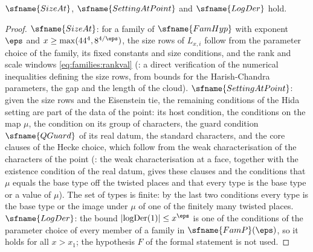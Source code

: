 \begin{lemma}\label{pf:fit:setting}
$\sfname{SizeAt}$, $\sfname{SettingAtPoint}$ and $\sfname{LogDer}$ hold.
\end{lemma}

\begin{proof}
$\sfname{SizeAt}$: for a family of $\sfname{FamHyp}$ with exponent $\eps$ and $x\ge\max(44^4,8^{4/\eps})$, the size rows
of $L_{x,i}$ follow from the parameter choice of the family, its fixed constants and size conditions, and the rank and
scale windows \eqref{eq:families:rankval} (: a direct
verification of the numerical inequalities defining the size rows, from bounds for the Harish-Chandra parameters, the
gap and the length of the cloud). $\sfname{SettingAtPoint}$: given the size rows and the Eisenstein tie, the remaining
conditions of the Hida setting are part of the data of the point: its host condition, the conditions on the map $\mu$, the
condition on its group of characters, the guard condition $\sfname{QGuard}$ of its real datum, the standard characters, and
the core clauses of the Hecke choice, which follow from the weak characterisation of the characters of the point
(: the weak characterisation at a
face, together with the existence condition of the real datum, gives these clauses and the conditions that $\mu$ equals
the base type off the twisted places and that every type is the base type or a value of $\mu$). The set of types is
finite: by the last two conditions every type is the base type or the image under $\mu$ of one of the finitely many
twisted places. $\sfname{LogDer}$: the bound $|\mathrm{logDer}(1)|\le x^\eps$ is one of the conditions of the parameter
choice of every member of a family in $\sfname{FamP}(\eps)$, so it holds for all $x>x_1$; the hypothesis $F$ of the
formal statement is not used.
\end{proof}


